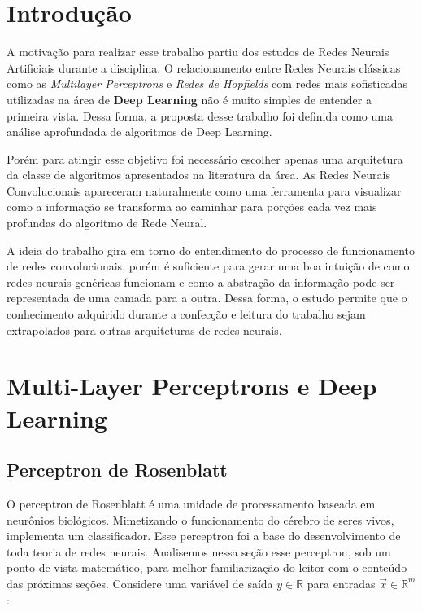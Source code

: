 \documentclass[
	12pt,				%
	oneside,			%
	a4paper,			%
	english,			%
	french,				%
	spanish,			%
	brazil,				%
	]{abntex2}
\begin{document}
\chapter[Introdução]{Introdução}

\par A motivação para realizar esse trabalho partiu dos estudos de Redes Neurais Artificiais durante a disciplina. O relacionamento entre Redes Neurais clássicas como as \textit{Multilayer Perceptrons} e \textit{Redes de Hopfields} com redes mais sofisticadas utilizadas na área de \textbf{Deep Learning} não é muito simples de entender a primeira vista. Dessa forma, a proposta desse trabalho foi definida como uma análise aprofundada de algoritmos de Deep Learning.

\par Porém para atingir esse objetivo foi necessário escolher apenas uma arquitetura da classe de algoritmos apresentados na literatura da área. As Redes Neurais Convolucionais apareceram naturalmente como uma ferramenta para visualizar como a informação se transforma ao caminhar para porções cada vez mais profundas do algoritmo de Rede Neural.

\par A ideia do trabalho gira em torno do entendimento do processo de funcionamento de redes convolucionais, porém é suficiente para gerar uma boa intuição de como redes neurais genéricas funcionam e como a abstração da informação pode ser representada de uma camada para a outra. Dessa forma, o estudo permite que o conhecimento adquirido durante a confecção e leitura do trabalho sejam extrapolados para outras arquiteturas de redes neurais.
	

\chapter{Multi-Layer Perceptrons e Deep Learning}


\section{Perceptron de Rosenblatt}
O perceptron de Rosenblatt é uma unidade de processamento baseada em neurônios biológicos. Mimetizando o funcionamento do cérebro de seres vivos, implementa um classificador. Esse perceptron foi a base do desenvolvimento de toda teoria de redes neurais. Analisemos nessa seção esse perceptron, sob um ponto de vista matemático, para melhor familiarização do leitor com o conteúdo das próximas seções. Considere uma variável de saída $y \in \mathbb{R}$ para entradas $\vec{x} \in \mathbb{R}^m$:
\end{document}
